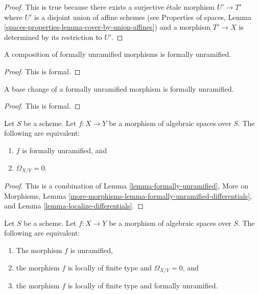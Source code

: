 \begin{proof}
This is true because there exists a surjective \'etale morphism
$U' \to T'$ where $U'$ is a disjoint union of affine schemes (see
Properties of spaces,
Lemma \ref{spaces-properties-lemma-cover-by-union-affines})
and a morphism $T' \to X$ is determined by its restriction to $U'$.
\end{proof}

\begin{lemma}
\label{lemma-composition-formally-unramified}
A composition of formally unramified morphisms is formally unramified.
\end{lemma}

\begin{proof}
This is formal.
\end{proof}

\begin{lemma}
\label{lemma-base-change-formally-unramified}
A base change of a formally unramified morphism is formally unramified.
\end{lemma}

\begin{proof}
This is formal.
\end{proof}

\begin{lemma}
\label{lemma-characterize-formally-unramified}
Let $S$ be a scheme. Let $f : X \to Y$ be a morphism of algebraic spaces over
$S$. The following are equivalent:
\begin{enumerate}
\item $f$ is formally unramified, and
\item $\Omega_{X/Y} = 0$.
\end{enumerate}
\end{lemma}

\begin{proof}
This is a combination of
Lemma \ref{lemma-formally-unramified},
More on Morphisms,
Lemma \ref{more-morphisms-lemma-formally-unramified-differentials},
and
Lemma \ref{lemma-localize-differentials}.
\end{proof}

\begin{lemma}
\label{lemma-unramified-formally-unramified}
Let $S$ be a scheme.
Let $f : X \to Y$ be a morphism of algebraic spaces over $S$.
The following are equivalent:
\begin{enumerate}
\item The morphism $f$ is unramified,
\item the morphism $f$ is locally of finite type and $\Omega_{X/Y} = 0$, and
\item the morphism $f$ is locally of finite type and formally unramified.
\end{enumerate}
\end{lemma}

